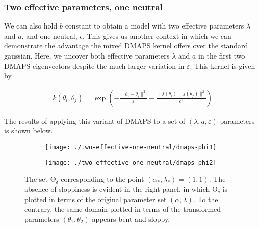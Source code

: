 \documentclass[11pt]{article}
\newcommand{\ps}{\mathrm{\Theta}}
\newcommand{\p}{\theta}
\newcommand{\eps}{\varepsilon}
\begin{document}
\subsubsection{Two effective parameters, one neutral}

We can also hold $b$ constant to obtain a model with two effective
parameters $\lambda$ and $a$, and one neutral, $\epsilon$. This gives
us another context in which we can demonstrate the advantage the mixed DMAPS
kernel offers over the standard gaussian. Here, we uncover both
effective parameters $\lambda$ and $a$ in the first two DMAPS
eigenvectors despite the much larger variation in $\eps$. This kernel
is given by

\begin{align*}
  k(\theta_i, \theta_j) = \exp(- \frac{\|\theta_i -
  \theta_j\|^2}{\eps}  - \frac{\|f(\theta_i) - f(\theta_j)\|^2}{\eps^2})
\end{align*}

The results of applying this variant of DMAPS to a set of $(\lambda,
a, \eps)$ parameters is shown below.


\begin{figure}[ht!]
  \begin{subfigure}[t]{0.49\textwidth}
    \centering
    \texttt{[image: ./two-effective-one-neutral/dmaps-phi1]}
  \end{subfigure}
  \begin{subfigure}[t]{0.49\textwidth}
    \centering
    \texttt{[image: ./two-effective-one-neutral/dmaps-phi2]}
  \end{subfigure} %
  \caption{The set $\ps_\delta$ corresponding to the point
    $(\alpha_*,\lambda_*) = (1,1)$. The absence of
    sloppiness is evident in the right panel, in which $\ps_\delta$ is
    plotted in terms of the original parameter set
    $(\alpha,\lambda)$. To the contrary, the same domain plotted in
    terms of the transformed parameters $(\p_1,\p_2)$ appears bent and
    sloppy. \label{f.transf-params}}
\end{figure}

% 
% 
\end{document}
